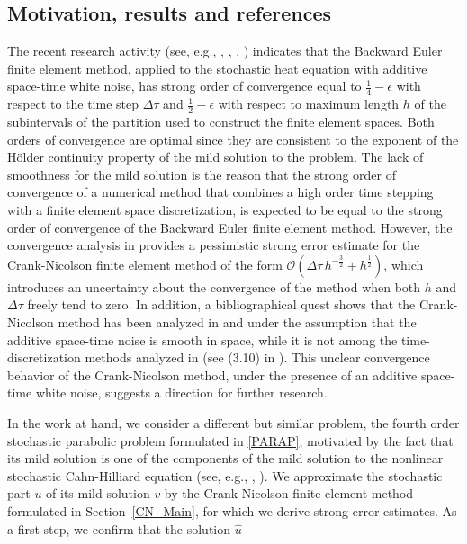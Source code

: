 \documentclass[10pt]{amsart}
\numberwithin{equation}{section}
\begin{document}
\subsection{Motivation, results and references}
\par
The recent research activity (see, e.g., \cite{YubinY03}, \cite{BinLi}, \cite{YubinY05}, \cite{Walsh05})
indicates that the Backward Euler finite element method, applied to the stochastic heat equation with
additive space-time white noise, has strong order of convergence equal to $\frac{1}{4}-\epsilon$
with respect to the time step $\Delta\tau$ and $\frac{1}{2}-\epsilon$ with respect to
maximum length $h$ of the subintervals of the partition used to construct the finite element spaces.
Both orders of convergence are optimal since they are consistent to the exponent of the
H{\"o}lder continuity property of the mild solution to the problem. 
The lack of smoothness for the mild solution is the reason that the strong order of convergence
of a numerical method that combines a high order time stepping with a finite
element space discretization, is expected to be equal to the strong order of convergence of the Backward
Euler finite element method.
However, the convergence analysis in \cite{Walsh05} provides a pessimistic strong error estimate 
for the Crank-Nicolson finite element method of the form
${\mathcal O}({\Delta\tau}\,h^{-\frac{3}{2}}+h^{\frac{1}{2}})$, which introduces an uncertainty about the
convergence of the method when both $h$ and ${\Delta\tau}$ freely tend to zero.
In addition, a bibliographical quest shows that the Crank-Nicolson method has been analyzed
in \cite{Erika02} and \cite{Erika03} under the assumption that the additive
space-time noise is smooth in space, while it is not among the time-discretization
methods analyzed in \cite{Printems} (see (3.10) in \cite{Printems}).
This unclear convergence behavior of the Crank-Nicolson
method, under the presence of an additive space-time white noise,
suggests a direction for further research.
\par
In the work at hand, we consider a different but similar problem,
the fourth order stochastic parabolic problem formulated in \eqref{PARAP},
motivated by the fact that its mild solution is one
of the components of the mild solution to the nonlinear stochastic Cahn-Hilliard
equation (see, e.g., \cite{DapDeb1}, \cite{Carolina1}).
We approximate the stochastic part $u$ of its mild solution $v$ by the
Crank-Nicolson finite element method formulated in Section~\ref{CN_Main},
for which we derive strong error estimates.
As a first step, we confirm that the solution ${\widehat u}$
\end{document}
